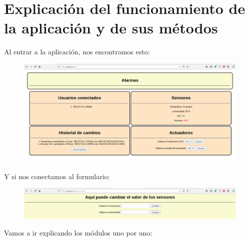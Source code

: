 \documentclass{article}
\begin{document}
	\section{Explicación del funcionamiento de la aplicación y de sus métodos}
	Al entrar a la aplicación, nos encontramos esto:
	\begin{figure}[H]
		\centering
		\includegraphics[totalheight=6cm]{img/1.png}
	\end{figure}
	Y si nos conectamos al formulario:
	\begin{figure}[H]
		\centering
		\includegraphics[totalheight=1.9cm]{img/2.png}
	\end{figure}
	Vamos a ir explicando los módulos uno por uno:
\end{document}
